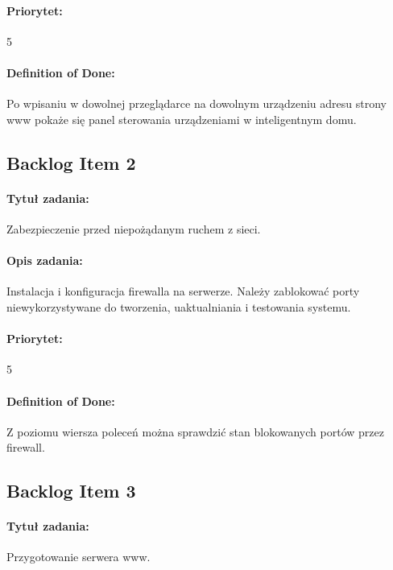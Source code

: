 	\paragraph{Priorytet:}
	5
	
	\paragraph{Definition of Done:}
	Po wpisaniu w dowolnej przeglądarce na dowolnym urządzeniu adresu strony www pokaże się panel sterowania urządzeniami w inteligentnym domu.
	

\subsection{Backlog Item 2}
\paragraph{Tytuł zadania:}
Zabezpieczenie przed niepożądanym ruchem z sieci.

\paragraph{Opis zadania:}
Instalacja i konfiguracja firewalla na serwerze. Należy zablokować porty niewykorzystywane do tworzenia, uaktualniania i testowania systemu.

\paragraph{Priorytet:}
5

\paragraph{Definition of Done:}
Z poziomu wiersza poleceń można sprawdzić stan blokowanych portów przez firewall.


\subsection{Backlog Item 3}
\paragraph{Tytuł zadania:}
Przygotowanie serwera www.

